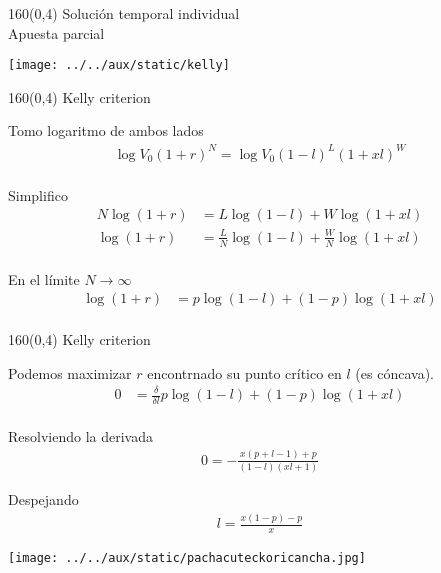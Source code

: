 \documentclass[shownotes,aspectratio=169]{beamer}
\begin{document}
\begin{frame}[plain]
 \begin{textblock}{160}(0,4)
  \centering \Large Solución temporal individual \\ \normalsize Apuesta parcial
 \end{textblock}

 \centering
\vspace{1cm}
 
\texttt{[image: ../../aux/static/kelly]}

 
\end{frame}

\begin{frame}[plain]
 \begin{textblock}{160}(0,4)
  \centering \Large Kelly criterion
 \end{textblock}
\vspace{1.3cm}
 
Tomo logaritmo de ambos lados
\begin{align*}
 \log V_0 (1+r)^N = \log V_0 (1-l)^L (1+xl)^W \\
\end{align*}

\pause

Simplifico
\begin{align*}
 N \log (1+r) &= L \log (1-l) + W \log (1+xl) \\
 \log (1+r) &= \frac{L}{N} \log (1-l) + \frac{W}{N} \log (1+xl) \\
\end{align*}

\pause

En el límite $N \rightarrow \infty$
\begin{align*}
 \log (1+r) &= p \log (1-l) + (1-p) \log (1+xl) \\
\end{align*}

\end{frame}

\begin{frame}[plain]
\begin{textblock}{160}(0,4)
  \centering \Large Kelly criterion
 \end{textblock}
\vspace{1.3cm}
 

Podemos maximizar $r$ encontrnado su punto crítico en $l$ (es cóncava).
\begin{align*}
0 &= \frac{\delta}{\delta l} p \log (1-l) + (1-p) \log (1+xl) \\
\end{align*}

\pause

Resolviendo la derivada
\begin{align*}
0 = - \frac{x (p+l-1) + p}{(1-l)(xl+1)}
\end{align*}

\pause

Despejando
\begin{align*}
 l = \frac{x(1 - p) - p}{x}
\end{align*}
 
\end{frame}


 
\begin{frame}[plain]
\centering
  \texttt{[image: ../../aux/static/pachacuteckoricancha.jpg]}
\end{frame}
\end{document}
